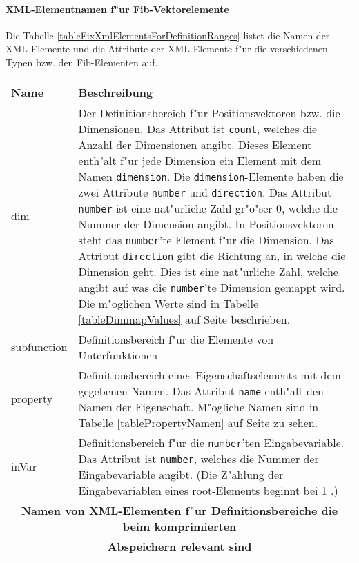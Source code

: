 \paragraph{XML-Elementnamen f"ur Fib-Vektorelemente}
\label{secXmlDefinitionrangesElements}

Die Tabelle \ref{tableFixXmlElementsForDefinitionRanges} listet die Namen der XML-Elemente und die Attribute der XML-Elemente f"ur die verschiedenen Typen bzw. den Fib-Elementen auf.

\begin{center}
\begin{longtable}{|p{25mm}|p{100mm}|}\hline
	Name & Beschreibung \\\hline\endhead
	dim & Der Definitionsbereich f"ur Positionsvektoren bzw. die Dimensionen. Das Attribut ist \verb|count|, welches die Anzahl der Dimensionen angibt. Dieses Element enth"alt f"ur jede Dimension ein Element mit dem Namen \verb|dimension|. Die \verb|dimension|-Elemente haben die zwei Attribute \verb|number| und \verb|direction|. Das Attribut \verb|number| ist eine nat"urliche Zahl gr"o"ser $0$, welche die Nummer der Dimension angibt. In Positionsvektoren steht das \verb|number|'te Element f"ur die Dimension. Das Attribut \verb|direction| gibt die Richtung an, in welche die Dimension geht. Dies ist eine nat"urliche Zahl, welche angibt auf was die \verb|number|'te Dimension gemappt wird. Die m"oglichen Werte sind in Tabelle \ref{tableDimmapValues} auf Seite \pageref{tableDimmapValues} beschrieben. \\\hline
	subfunction & Definitionsbereich f"ur die Elemente von Unterfunktionen \\\hline
	property & Definitionsbereich eines Eigenschaftselements mit dem gegebenen Namen. Das Attribut \verb|name| enth"alt den Namen der Eigenschaft. M"ogliche Namen sind in Tabelle \ref{tablePropertyNamen} auf Seite \pageref{tablePropertyNamen} zu sehen.\\\hline
	inVar & Definitionsbereich f"ur die \verb|number|'ten Eingabevariable. Das Attribut ist \verb|number|, welches die Nummer der Eingabevariable angibt. (Die Z"ahlung der Eingabevariablen eines root-Elements beginnt bei 1 .)\\\hline

	\multicolumn{2}{|c|}{\textbf{Namen von XML-Elementen f"ur Definitionsbereiche die beim komprimierten}}\\
	\multicolumn{2}{|c|}{\textbf{Abspeichern relevant sind}}\\\hline


\end{longtable}
\end{center}
